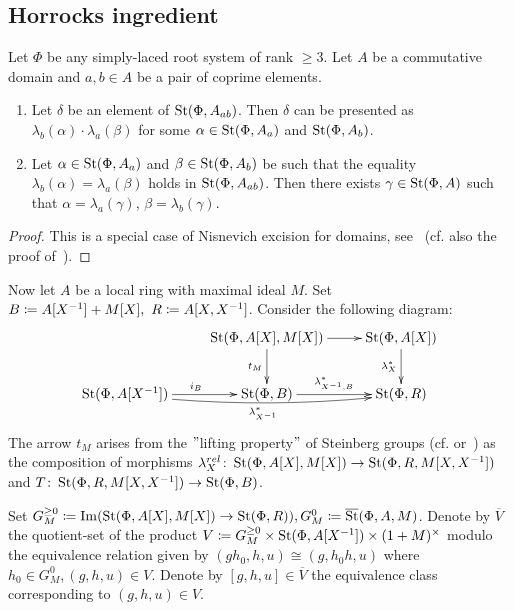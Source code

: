 \subsection{Horrocks ingredient}\label{subsec:horrocks-ingredient}
\begin{lemma} \label{lem:zariski-glueing}
Let $\Phi$ be any simply-laced root system of rank $\geq 3$.
Let $A$ be a commutative domain and $a, b \in A$ be a pair of coprime elements.
\begin{enumerate}
    \item Let $\delta$ be an element of $\operatorname{St}(\Phi, A_{ab})$.
    Then $\delta$ can be presented as $\lambda_b(\alpha) \cdot \lambda_a(\beta)$ for some
    $\alpha \in \operatorname{St}(\Phi, A_a)$ and \beta \in $\operatorname{St}(\Phi, A_b)$.
    \item  Let $\alpha \in \operatorname{St}(\Phi, A_a)$ and $\beta \in \operatorname{St}(\Phi, A_b)$ be such that the equality $\lambda_b(\alpha) = \lambda_a(\beta)$ holds in $\operatorname{St}(\Phi, A_{ab})$.
    Then there exists $\gamma \in \operatorname{St}(\Phi, A)$ such that $\alpha = \lambda_a(\gamma)$, $\beta = \lambda_b(\gamma)$.
\end{enumerate}

\end{lemma}
\begin{proof}
    This is a special case of Nisnevich excision for domains, see~\cite[Proposition~4.5]{LSV2}
    (cf. also the proof of~\cite[Lemma~2.6]{LSV2}).
\end{proof}

Now let $A$ be a local ring with maximal ideal $M$.
Set $B \coloneqq A[X^{-1}] + M[X],\ R \coloneqq A[X, X^{-1}]$.
Consider the following diagram:
\[ \xymatrix{ & \St(\Phi, A[X], M[X]) \ar[d]_{t_M} \ar[r] & \St(\Phi, A[X]) \ar[d]_{\lambda_X^*} \\
\St(\Phi, A[X\inv]) \ar[r]^{i_B} \ar@/_/[rr]_{\lambda_{X\inv}^*} & \St(\Phi, B) \ar[r]^{\lambda^*_{X\inv, B}} & \St(\Phi, R)
}\]
The arrow $t_M$ arises from the \("\)lifting property\("\) of Steinberg groups (cf. \cite[Lemma~3.3]{LS20} or~\cite[Theorem~3]{LS17}) as the composition of morphisms
$\lambda_{X}^{rel}\colon \operatorname{St}(\Phi, A[X], M[X]) \to \operatorname{St}(\Phi, R, M[X, X^{-1}])$ and $T \colon \operatorname{St}(\Phi, R, M[X, X^{-1}]) \to \operatorname{St}(\Phi, B)$.

Set $G_M^{\geq 0} \coloneqq \operatorname{Im}(\operatorname{St}(\Phi, A[X], M[X]) \to \operatorname{St}(\Phi, R)), G_M^0 \coloneqq \overline{\operatorname{St}}(\Phi, A, M)$.%
Denote by $\overline{V}$ the quotient-set of the product $V \coloneqq G_M^{\geq 0} \times \operatorname{St}(\Phi, A[X^{-1}]) \times (1 + M)^\times$
modulo the equivalence relation given by $(gh_0, h, u) \cong (g, h_0h, u)$ where $h_0 \in G_M^0, (g, h, u) \in V.$
Denote by $[g, h, u] \in \overline{V}$ the equivalence class corresponding to $(g, h, u)\in V$.


